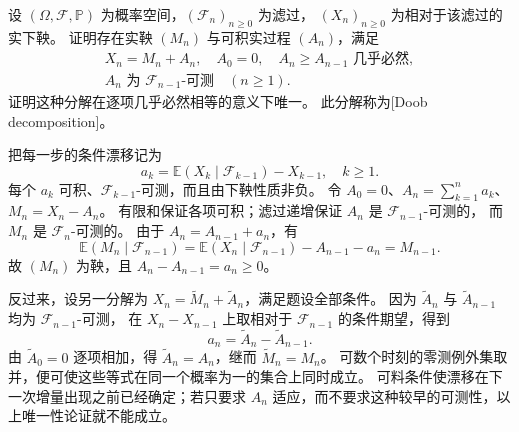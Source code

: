 \begin{exercise}\label{b1:ex:31-doob-decomposition}
设 \((\Omega,\mathcal F,\mathbb P)\) 为概率空间，\((\mathcal F_n)_{n\geq0}\) 为滤过，
\((X_n)_{n\geq0}\) 为相对于该滤过的实下鞅。
证明存在实鞅 \((M_n)\) 与可积实过程 \((A_n)\)，满足
\[
 \begin{gathered}
 X_n=M_n+A_n,\quad A_0=0,\quad A_n\geq A_{n-1}\text{ 几乎必然},\\
 A_n\text{ 为 }\mathcal F_{n-1}\text{-可测}\quad(n\geq1).
 \end{gathered}
\]
证明这种分解在逐项几乎必然相等的意义下唯一。
此分解称为[Doob decomposition]。
\end{exercise}
\begin{solution}
把每一步的条件漂移记为
\[
 a_k=\mathbb E(X_k\mid\mathcal F_{k-1})-X_{k-1},\quad k\geq1.
\]
每个 \(a_k\) 可积、\(\mathcal F_{k-1}\)-可测，而且由下鞅性质非负。
令 \(A_0=0\)、\(A_n=\sum_{k=1}^na_k\)、\(M_n=X_n-A_n\)。
有限和保证各项可积；滤过递增保证 \(A_n\) 是 \(\mathcal F_{n-1}\)-可测的，
而 \(M_n\) 是 \(\mathcal F_n\)-可测的。
由于 \(A_n=A_{n-1}+a_n\)，有
\[
 \mathbb E(M_n\mid\mathcal F_{n-1})
 =\mathbb E(X_n\mid\mathcal F_{n-1})-A_{n-1}-a_n
 =M_{n-1}.
\]
故 \((M_n)\) 为鞅，且 \(A_n-A_{n-1}=a_n\geq0\)。

反过来，设另一分解为 \(X_n=\widetilde M_n+\widetilde A_n\)，满足题设全部条件。
因为 \(\widetilde A_n\) 与 \(\widetilde A_{n-1}\) 均为 \(\mathcal F_{n-1}\)-可测，
在 \(X_n-X_{n-1}\) 上取相对于 \(\mathcal F_{n-1}\) 的条件期望，得到
\[
 a_n=\widetilde A_n-\widetilde A_{n-1}.
\]
由 \(\widetilde A_0=0\) 逐项相加，得 \(\widetilde A_n=A_n\)，继而 \(\widetilde M_n=M_n\)。
可数个时刻的零测例外集取并，便可使这些等式在同一个概率为一的集合上同时成立。
可料条件使漂移在下一次增量出现之前已经确定；若只要求 \(A_n\) 适应，而不要求这种较早的可测性，以上唯一性论证就不能成立。
\end{solution}

